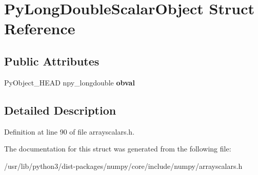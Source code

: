 \hypertarget{structPyLongDoubleScalarObject}{}\section{Py\+Long\+Double\+Scalar\+Object Struct Reference}
\label{structPyLongDoubleScalarObject}
\subsection*{Public Attributes}
\begin{DoxyCompactItemize}
\item 
Py\+Object\+\_\+\+H\+E\+AD npy\+\_\+longdouble {\bfseries obval}\hypertarget{structPyLongDoubleScalarObject_ab0651e8c5a31d24d2672e45c3f206fee}{}\label{structPyLongDoubleScalarObject_ab0651e8c5a31d24d2672e45c3f206fee}

\end{DoxyCompactItemize}


\subsection{Detailed Description}


Definition at line 90 of file arrayscalars.\+h.



The documentation for this struct was generated from the following file\+:\begin{DoxyCompactItemize}
\item 
/usr/lib/python3/dist-\/packages/numpy/core/include/numpy/arrayscalars.\+h\end{DoxyCompactItemize}
